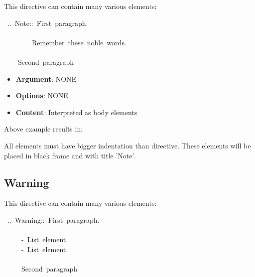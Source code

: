 \documentclass[12pt]{article}
\begin{document}
This directive can contain many various elements:

\begin{ttfamily}\begin{flushleft}
\mbox{~..~Note::~First~paragraph.}\\
\mbox{}\\
\mbox{~~~~~~~~Remember~these~noble~words.}\\
\mbox{}\\
\mbox{~~~~Second~paragraph}\\
\end{flushleft}\end{ttfamily}

\begin{itemize}
\item
\textbf{Argument}: NONE

\item
\textbf{Options}: NONE

\item
\textbf{Content}: Interpreted as body elements
\end{itemize}

Above example results in:

 \begin{center}
\end{center}

All elements must have bigger indentation than directive. These
elements will be placed in black frame and with title 'Note'.

\hypertarget{lwarning}{}
\subsection{Warning}

This directive can contain many various elements:

\begin{ttfamily}\begin{flushleft}
\mbox{~..~Warning::~First~paragraph.}\\
\mbox{}\\
\mbox{~~~~~-~List~element}\\
\mbox{~~~~~-~List~element}\\
\mbox{}\\
\mbox{~~~~~Second~paragraph}\\
\end{flushleft}\end{ttfamily}
\end{document}
